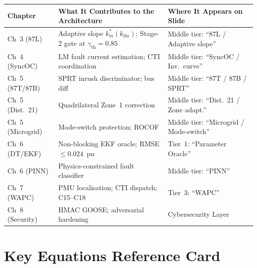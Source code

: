 \documentclass[12pt,a4paper]{article}
\newcommand{\kibr}{k_\mathrm{ibr}}
\newcommand{\km}{k_m}
\newcommand{\gammath}{\gamma_\mathrm{th}}
\begin{document}
\begin{center}
\small
\begin{tabularx}{\linewidth}{@{}lXX@{}}
\toprule
\textbf{Chapter} & \textbf{What It Contributes to the Architecture} & \textbf{Where It Appears on Slide} \\
\midrule
Ch~3 (87L) & Adaptive slope $\km^*(\kibr)$; Stage-2 gate at $\gammath=0.85$ & Middle tier: ``87L / Adaptive slope'' \\
Ch~4 (SyncOC) & LM fault current estimation; CTI coordination & Middle tier: ``SyncOC / Inv.\ curve'' \\
Ch~5 (87T/87B) & SPRT inrush discriminator; bus diff & Middle tier: ``87T / 87B / SPRT'' \\
Ch~5 (Dist.~21) & Quadrilateral Zone~1 correction & Middle tier: ``Dist.\ 21 / Zone adapt.'' \\
Ch~5 (Microgrid) & Mode-switch protection; ROCOF & Middle tier: ``Microgrid / Mode-switch'' \\
Ch~6 (DT/EKF) & Non-blocking EKF oracle; RMSE $\leq 0.024$~pu & Tier~1: ``Parameter Oracle'' \\
Ch~6 (PINN) & Physics-constrained fault classifier & Middle tier: ``PINN'' \\
Ch~7 (WAPC) & PMU localisation; CTI dispatch; C15--C18 & Tier~3: ``WAPC'' \\
Ch~8 (Security) & HMAC GOOSE; adversarial hardening & Cybersecurity Layer \\
\bottomrule
\end{tabularx}
\end{center}

\section{Key Equations Reference Card}
\end{document}
